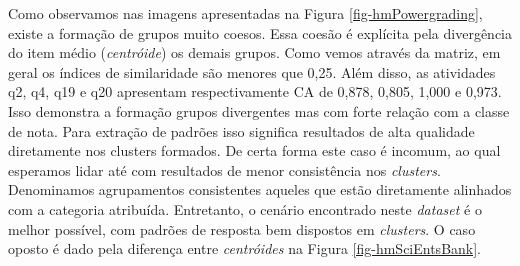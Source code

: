Como observamos nas imagens apresentadas na Figura \ref{fig-hmPowergrading}, existe a formação de grupos muito coesos. Essa coesão é explícita pela divergência do item médio (\textit{centróide}) os demais grupos. Como vemos através da matriz, em geral os índices de similaridade são menores que 0,25. Além disso, as atividades q2, q4, q19 e q20 apresentam respectivamente CA de 0,878, 0,805, 1,000 e 0,973. Isso demonstra a formação grupos divergentes mas com forte relação com a classe de nota. Para extração de padrões isso significa resultados de alta qualidade diretamente nos clusters formados. De certa forma este caso é incomum, ao qual esperamos lidar até com resultados de menor consistência nos \textit{clusters}. Denominamos agrupamentos consistentes aqueles que estão diretamente alinhados com a categoria atribuída. Entretanto, o cenário encontrado neste \textit{dataset} é o melhor possível, com padrões de resposta bem dispostos em \textit{clusters}. O caso oposto é dado pela diferença entre \textit{centróides} na Figura \ref{fig-hmSciEntsBank}.


